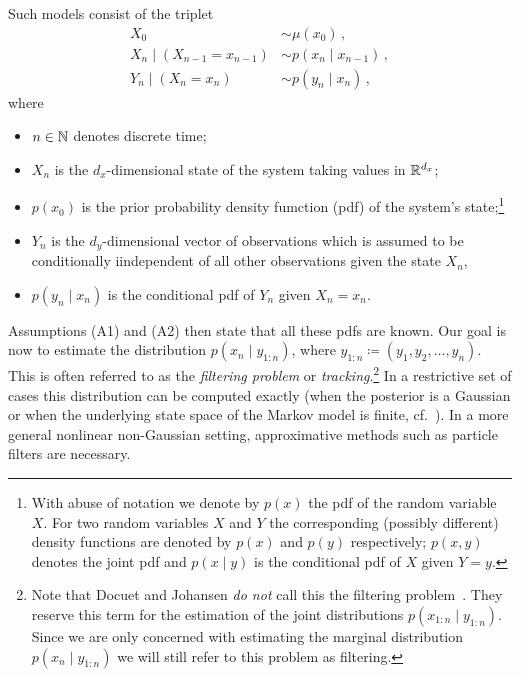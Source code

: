 Such models consist of the triplet
\begin{align*}
  \label{eq:hmm:1}
  X_0 &\sim \mu(x_0)\,,\\
  X_n \mid (X_{n-1} = x_{n-1}) &\sim p(x_n \mid x_{n-1})\,,\\
  Y_n \mid (X_n = x_n) &\sim p(y_n \mid x_n) \,,
\end{align*}
where
\begin{itemize}
\item $n \in \mathbb{N}$ denotes discrete time;
\item $X_n$ is the $d_x$-dimensional state of the system taking values
  in $\mathbb{R}^{d_x}$;
\item $p(x_0)$ is the prior probability density fumction (pdf) of the
  system's state;\footnote{ With abuse of notation we denote by $p(x)$
    the pdf of the random variable $X$. For two random variables $X$
    and $Y$ the corresponding (possibly different) density functions
    are denoted by $p(x)$ and $p(y)$ respectively; $p(x,y)$ denotes
    the joint pdf and $p(x \mid y)$ is the conditional pdf of $X$
    given $Y = y$.}
\item $Y_n$ is the $d_y$-dimensional vector of observations which is
  assumed to be conditionally iindependent of all other observations
  given the state $X_n$,
\item $p(y_n \mid x_n)$ is the conditional pdf of $Y_n$ given
  $X_n = x_n$.
\end{itemize}
Assumptions (A1) and (A2) then state that all these pdfs are known.
Our goal is now to estimate the distribution $p(x_n \mid y_{1:n})$,
where $y_{1:n} \coloneqq (y_1, y_2, \dotsc, y_n)$. This is often
referred to as the \emph{filtering problem} or
\emph{tracking}.\footnote{Note that Docuet and Johansen \emph{do not}
  call this the filtering problem~\cite{doucet}. They reserve this
  term for the estimation of the joint distributions
  $p(x_{1:n} \mid y_{1:n} )$. Since we are only concerned with
  estimating the marginal distribution $p(x_n \mid y_{1:n} )$ we will
  still refer to this problem as filtering.}  In a restrictive set of
cases this distribution can be computed exactly (\eg when the
posterior is a Gaussian or when the underlying state space of the
Markov model is finite, cf.~\cite[Example 1 and 2]{doucet}). In a more
general nonlinear non-Gaussian setting, approximative methods such as
particle filters are necessary.

